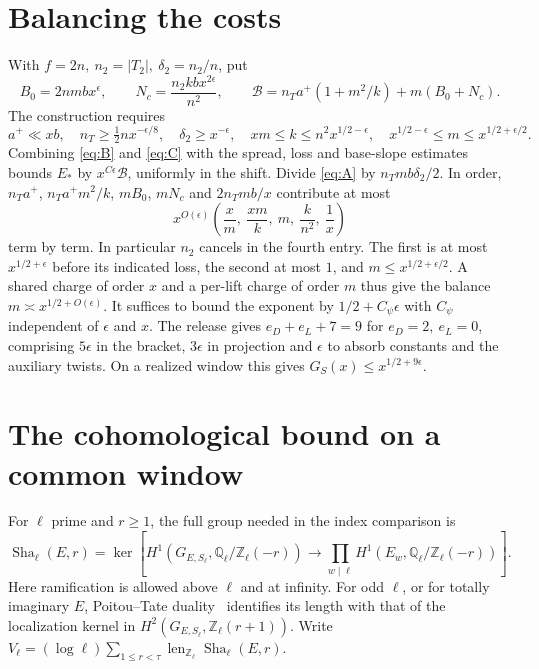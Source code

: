 \documentclass[letterpaper,11pt]{article}
\newcommand{\QQ}{\mathbb Q}
\newcommand{\ZZ}{\mathbb Z}
\newcommand{\Sha}{\operatorname{Sha}}
\newcommand{\len}{\operatorname{len}}
\begin{document}
\section{Balancing the costs}\label{sec:balance}
With \(f=2n,\ n_2=|T_2|,\ \delta_2=n_2/n\), put
\[
 B_0=2nmbx^\epsilon,\qquad N_c=\frac{n_2kb x^{2\epsilon}}{n^2},\qquad
 \mathcal B=n_Ta^+(1+m^2/k)+m(B_0+N_c).
\]
The construction requires
\[
 a^+\ll xb,\quad n_T\ge \tfrac12nx^{-\epsilon/8},\quad
 \delta_2\ge x^{-\epsilon},\quad xm\le k\le n^2x^{1/2-\epsilon},\quad
 x^{1/2-\epsilon}\le m\le x^{1/2+\epsilon/2}.
\]
Combining \eqref{eq:B} and \eqref{eq:C} with the spread, loss and base-slope estimates bounds \(E_*\) by \(x^{C\epsilon}\mathcal B\), uniformly in the shift. Divide \eqref{eq:A} by \(n_Tmb\delta_2/2\). In order, \(n_Ta^+\), \(n_Ta^+m^2/k\), \(mB_0\), \(mN_c\) and \(2n_Tmb/x\) contribute at most
\[
 x^{O(\epsilon)}\left(\frac{x}{m},\ \frac{xm}{k},\ m,\ \frac{k}{n^2},\ \frac1x\right)
\]
term by term. In particular \(n_2\) cancels in the fourth entry. The first is at most \(x^{1/2+\epsilon}\) before its indicated loss, the second at most \(1\), and \(m\le x^{1/2+\epsilon/2}\). A shared charge of order \(x\) and a per-lift charge of order \(m\) thus give the balance \(m\asymp x^{1/2+O(\epsilon)}\). It suffices to bound the exponent by \(1/2+C_\psi\epsilon\) with \(C_\psi\) independent of \(\epsilon\) and \(x\). The release gives \(e_D+e_L+7=9\) for \(e_D=2,\ e_L=0\), comprising \(5\epsilon\) in the bracket, \(3\epsilon\) in projection and \(\epsilon\) to absorb constants and the auxiliary twists. On a realized window this gives \(G_S(x)\le x^{1/2+9\epsilon}\).

\section{The cohomological bound on a common window}\label{sec:torsion}
For \(\ell\) prime and \(r\ge1\), the full group needed in the index comparison is
\[
 \Sha_\ell(E,r)=\ker\!\left[H^1(G_{E,S_\ell},\QQ_\ell/\ZZ_\ell(-r))
       \longrightarrow\prod_{w\mid\ell}H^1(E_w,\QQ_\ell/\ZZ_\ell(-r))\right].
\]
Here ramification is allowed above \(\ell\) and at infinity. For odd \(\ell\), or for totally imaginary \(E\), Poitou--Tate duality~\cite{nsw} identifies its length with that of the localization kernel in \(H^2(G_{E,S_\ell},\ZZ_\ell(r+1))\). Write \(V_\ell=(\log\ell)\sum_{1\le r<\tau}\len_{\ZZ_\ell}\Sha_\ell(E,r)\).
\end{document}
